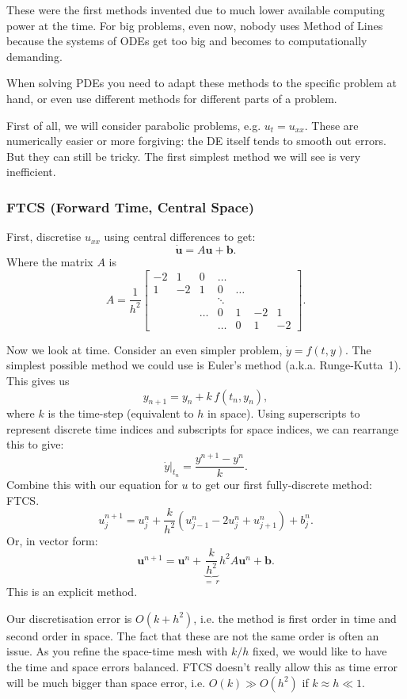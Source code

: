 \documentclass[12pt, a4paper]{article}
\theoremstyle{definition}
\theoremstyle{remark}
\numberwithin{equation}{section}
\begin{document}
These were the first methods invented due to much lower available computing
power at the time. For big problems, even now, nobody uses Method of Lines because the
systems of ODEs get too big and becomes to computationally demanding.


When solving PDEs you need to adapt these methods to the specific problem at hand, or even use
different methods for different parts of a problem.



First of all, we will consider parabolic problems, e.g. $u_t = u_{xx}$.
These are numerically easier or more forgiving:
the DE itself tends to smooth out errors. But they can still be tricky. The first simplest
method we will see is very inefficient.

\newpage
\subsubsection{FTCS (Forward Time, Central Space)}
First, discretise $u_{xx}$ using central differences to get: 
$$\mathbf{\dot u} = A \mathbf{u} + \mathbf{b}.$$
Where the matrix $A$ is
$$ A = \frac{1}{h^2} \left[ \begin{array}{ccccccc}
-2 & 1 & 0 & \ldots & & \\
1 & -2 & 1 & 0 & \ldots & \\
& & & \ddots & \\
& & \ldots & 0 & 1 & -2 & 1 \\
& & & \ldots & 0 & 1 & -2
\end{array} \right]. $$

Now we look at time. Consider an even simpler problem, $\dot{y} = f(t,y)$. The
simplest possible method we could use is Euler's method (a.k.a. Runge-Kutta~1).
This gives us
$$ y_{n+1}= y_n + k\,f(t_n, y_n), $$
where $k$ is the time-step (equivalent to $h$ in space). Using superscripts to
represent discrete time indices and subscripts for space indices, we can rearrange
this to give:
$$ \left. \dot{y} \right|_{t_n} = \frac{y^{n+1} - y^n}{k}.$$
Combine this with our equation for $u$ to get our first fully-discrete method:
FTCS.
$$ u_j^{n+1} = u_j^n + \frac{k}{h^2}\left( u_{j-1}^n - 2u_j^n + u_{j+1}^n \right) + b_j^n. $$
Or, in vector form:
$$ \mathbf{u}^{n+1} = \mathbf{u}^n + \underbrace{\frac{k}{h^2}}_{=\ r} h^2A \mathbf{u}^n + \mathbf{b} .$$
This is an explicit method.

Our discretisation error is $O(k+h^2)$, i.e. the method is first order in time
and second order in space. The fact that these are not the same order is often
an issue. As you refine the space-time mesh with $k/h$ fixed, we would like to have
the time and space errors balanced. FTCS doesn't really allow this as time error
will be much bigger than space error, i.e. $O(k) \gg O(h^2)$ if $k \approx h \ll 1$.
\end{document}
